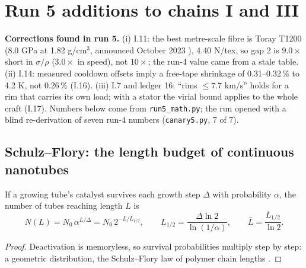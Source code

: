 \section*{Run 5 additions to chains I and III}
\noindent\textbf{Corrections found in run 5.} (i) I.11: the best metre-scale fibre is Toray T1200 (8.0 GPa at 1.82 g/cm$^3$, announced October
2023 \cite{toray23}), 4.40 N/tex, so gap 2 is $9.0\times$ short in $\sigma/\rho$ ($3.0\times$ in speed), not $10\times$; the run-4 value came from a
stale table. (ii) I.14: measured cooldown offsets imply a free-tape shrinkage of 0.31--0.32\,\% to 4.2 K, not 0.26\,\% (I.16). (iii) I.7 and
ledger 16: ``rims $\le7.7$ km/s'' holds for a rim that carries its own load; with a stator the virial bound applies to the whole craft (I.17).
Numbers below come from \texttt{run5\_math.py}; the run opened with a blind re-derivation of seven run-4 numbers (\texttt{canary5.py}, 7 of 7).

\setcounter{section}{1}\setcounter{subsection}{14}
\subsection{Schulz--Flory: the length budget of continuous nanotubes}
\begin{statement}
If a growing tube's catalyst survives each growth step $\Delta$ with probability $\alpha$, the number of tubes reaching length $L$ is
\begin{equation}
N(L)=N_0\,\alpha^{L/\Delta}=N_0\,2^{-L/L_{1/2}},\qquad L_{1/2}=\frac{\Delta\ln2}{\ln(1/\alpha)},\qquad \bar L=\frac{L_{1/2}}{\ln2}.\label{eq:sf}
\end{equation}
\end{statement}
\begin{proof}Deactivation is memoryless, so survival probabilities multiply step by step: a geometric distribution, the Schulz--Flory
law of polymer chain lengths \cite{zhang13}.\end{proof}

